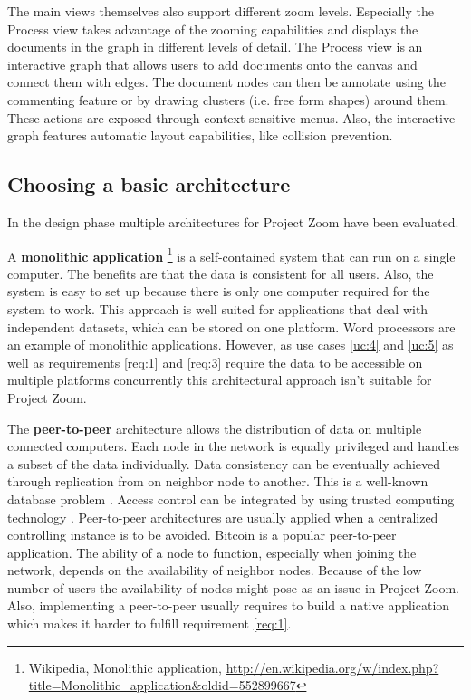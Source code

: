 The main views themselves also support different zoom levels. Especially the Process view takes advantage of the zooming capabilities and displays the documents in the graph in different levels of detail. 
The Process view is an interactive graph that allows users to add documents onto the canvas and connect them with edges. The document nodes can then be annotate using the commenting feature or by drawing clusters (i.e. free form shapes) around them. These actions are exposed through context-sensitive menus. Also, the interactive graph features automatic layout capabilities, like collision prevention.

\subsection{Choosing a basic architecture}
In the design phase multiple architectures for Project Zoom have been evaluated. 

A \textbf{monolithic application} \footnote{Wikipedia, Monolithic application, \url{http://en.wikipedia.org/w/index.php?title=Monolithic_application&oldid=552899667}} is a self-contained system that can run on a single computer. The benefits are that the data is consistent for all users.  Also, the system is easy to set up because there is only one computer required for the system to work. This approach is well suited for applications that deal with independent datasets, which can be stored on one platform. Word processors are an example of monolithic applications. However, as use cases \ref{uc:4} and \ref{uc:5} as well as requirements \ref{req:1} and \ref{req:3} require the data to be accessible on multiple platforms concurrently this architectural approach isn't suitable for Project Zoom.

The \textbf{peer-to-peer} \cite{Schollmeier_2001} architecture allows the distribution of data on multiple connected computers. Each node in the network is equally privileged and handles a subset of the data individually. Data consistency can be eventually achieved through replication from on neighbor node to another. This is a well-known database problem \cite{Gray_1996}. Access control can be integrated by using trusted computing technology \cite{Sandhu_2005}. Peer-to-peer architectures are usually applied when a centralized controlling instance is to be avoided. Bitcoin is a popular peer-to-peer application. The ability of a node to function, especially when joining the network, depends on the availability of neighbor nodes. Because of the low number of users the availability of nodes might pose as an issue in Project Zoom. Also, implementing a peer-to-peer usually requires to build a native application which makes it harder to fulfill requirement \ref{req:1}.


